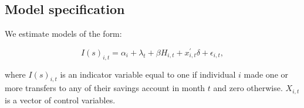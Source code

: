 \subsection{Model specification}%
\label{sub:model_specification}

We estimate models of the form: 

\begin{equation}
    I(s)_{i,t} = \alpha_i + \lambda_t + \beta H_{i,t} + x^\prime_{i,t} \delta +
    \epsilon_{i,t},
\end{equation}

where $I(s)_{i,t}$ is an indicator variable equal to one if individual $i$ made
one or more transfers to any of their savings account in month $t$ and zero
otherwise. $X_{i,t}$ is a vector of control variables.
